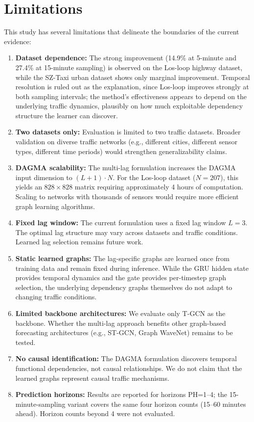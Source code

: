 \section{Limitations}\label{sec:limitations}

This study has several limitations that delineate the boundaries of the current evidence:

\begin{enumerate}
    \item \textbf{Dataset dependence:} The strong improvement (14.9\% at 5-minute and 27.4\% at 15-minute sampling) is observed on the Los-loop highway dataset, while the SZ-Taxi urban dataset shows only marginal improvement. Temporal resolution is ruled out as the explanation, since Los-loop improves strongly at both sampling intervals; the method's effectiveness appears to depend on the underlying traffic dynamics, plausibly on how much exploitable dependency structure the learner can discover.

    \item \textbf{Two datasets only:} Evaluation is limited to two traffic datasets. Broader validation on diverse traffic networks (e.g., different cities, different sensor types, different time periods) would strengthen generalizability claims.

    \item \textbf{DAGMA scalability:} The multi-lag formulation increases the DAGMA input dimension to $(L+1) \cdot N$. For the Los-loop dataset ($N=207$), this yields an $828 \times 828$ matrix requiring approximately 4 hours of computation. Scaling to networks with thousands of sensors would require more efficient graph learning algorithms.

    \item \textbf{Fixed lag window:} The current formulation uses a fixed lag window $L=3$. The optimal lag structure may vary across datasets and traffic conditions. Learned lag selection remains future work.

    \item \textbf{Static learned graphs:} The lag-specific graphs are learned once from training data and remain fixed during inference. While the GRU hidden state provides temporal dynamics and the gate provides per-timestep graph selection, the underlying dependency graphs themselves do not adapt to changing traffic conditions.

    \item \textbf{Limited backbone architectures:} We evaluate only T-GCN as the backbone. Whether the multi-lag approach benefits other graph-based forecasting architectures (e.g., ST-GCN, Graph WaveNet) remains to be tested.

    \item \textbf{No causal identification:} The DAGMA formulation discovers temporal functional dependencies, not causal relationships. We do not claim that the learned graphs represent causal traffic mechanisms.

    \item \textbf{Prediction horizons:} Results are reported for horizons PH=1--4; the 15-minute-sampling variant covers the same four horizon counts (15--60 minutes ahead). Horizon counts beyond 4 were not evaluated.
\end{enumerate}
